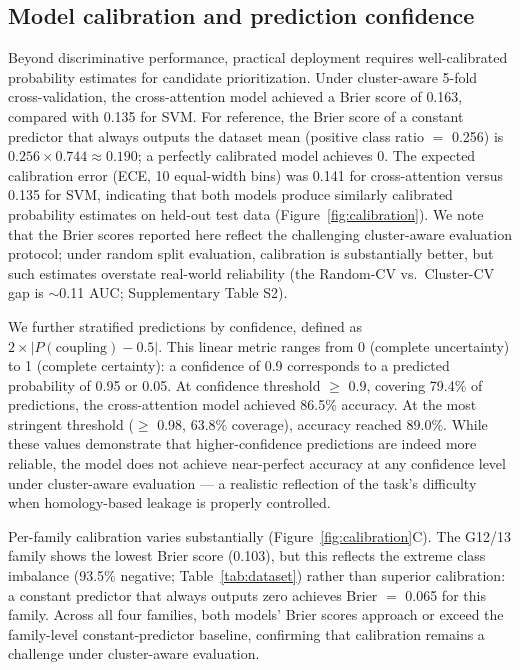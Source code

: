 \documentclass[11pt,a4paper]{article}
\begin{document}
\subsection{Model calibration and prediction confidence}

Beyond discriminative performance, practical deployment requires well-calibrated probability estimates for candidate prioritization. Under cluster-aware 5-fold cross-validation, the cross-attention model achieved a Brier score of 0.163, compared with 0.135 for SVM. For reference, the Brier score of a constant predictor that always outputs the dataset mean (positive class ratio $=$ 0.256) is $0.256 \times 0.744 \approx 0.190$; a perfectly calibrated model achieves 0. The expected calibration error (ECE, 10 equal-width bins) was 0.141 for cross-attention versus 0.135 for SVM, indicating that both models produce similarly calibrated probability estimates on held-out test data (Figure~\ref{fig:calibration}). We note that the Brier scores reported here reflect the challenging cluster-aware evaluation protocol; under random split evaluation, calibration is substantially better, but such estimates overstate real-world reliability (the Random-CV vs.\ Cluster-CV gap is $\sim$0.11 AUC; Supplementary Table S2).

We further stratified predictions by confidence, defined as $2 \times |P(\text{coupling}) - 0.5|$. This linear metric ranges from 0 (complete uncertainty) to 1 (complete certainty): a confidence of 0.9 corresponds to a predicted probability of 0.95 or 0.05. At confidence threshold $\ge$ 0.9, covering 79.4\% of predictions, the cross-attention model achieved 86.5\% accuracy. At the most stringent threshold ($\ge$ 0.98, 63.8\% coverage), accuracy reached 89.0\%. While these values demonstrate that higher-confidence predictions are indeed more reliable, the model does not achieve near-perfect accuracy at any confidence level under cluster-aware evaluation — a realistic reflection of the task's difficulty when homology-based leakage is properly controlled.

Per-family calibration varies substantially (Figure~\ref{fig:calibration}C). The G12/13 family shows the lowest Brier score (0.103), but this reflects the extreme class imbalance (93.5\% negative; Table~\ref{tab:dataset}) rather than superior calibration: a constant predictor that always outputs zero achieves Brier $=$ 0.065 for this family. Across all four families, both models' Brier scores approach or exceed the family-level constant-predictor baseline, confirming that calibration remains a challenge under cluster-aware evaluation.
\end{document}
